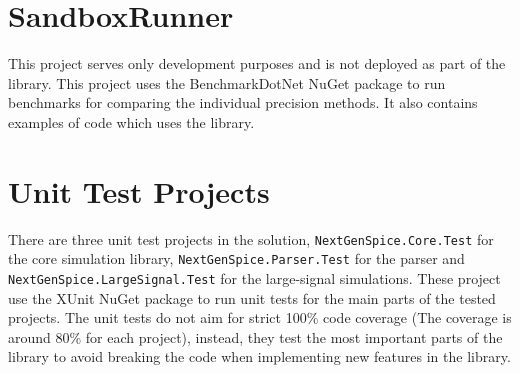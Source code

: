 \section{SandboxRunner}
This project serves only development purposes and is not deployed as part of the library. This project uses the BenchmarkDotNet NuGet package to run benchmarks for comparing the individual precision methods. It also contains examples of code which uses the library.

\section{Unit Test Projects}
There are three unit test projects in the solution, \texttt{NextGenSpice.Core.Test} for the core simulation library, \texttt{NextGenSpice.Parser.Test} for the parser and \texttt{NextGenSpice.LargeSignal.Test} for the large-signal simulations. These project use the XUnit NuGet package to run unit tests for the main parts of the tested projects. The unit tests do not aim for strict 100\% code coverage (The coverage is around 80\% for each project), instead, they test the most important parts of the library to avoid breaking the code when implementing new features in the library.
